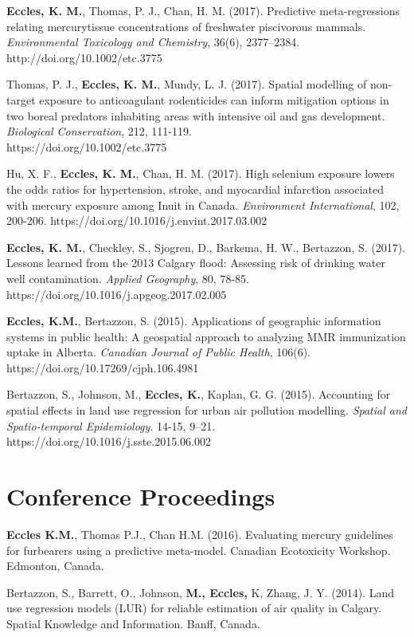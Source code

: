 \documentclass[margin,line]{res}
\begin{document}
\begin{resume}
\textbf{Eccles, K. M.}, Thomas, P. J., Chan, H. M. (2017). Predictive meta-regressions relating mercurytissue concentrations of freshwater piscivorous mammals. \textit{Environmental Toxicology and Chemistry}, 36(6), 2377–2384. http://doi.org/10.1002/etc.3775

Thomas, P. J., \textbf{Eccles, K. M.}, Mundy, L. J. (2017). Spatial modelling of non-target exposure to anticoagulant rodenticides can inform mitigation options in two boreal predators inhabiting areas with intensive oil and gas development. \textit{Biological Conservation}, 212, 111-119. \\https://doi.org/10.1002/etc.3775

Hu, X. F., \textbf{Eccles, K. M.}, Chan, H. M. (2017). High selenium exposure lowers the odds ratios for hypertension, stroke, and myocardial infarction associated with mercury exposure among Inuit in Canada. \textit{Environment International}, 102, 200-206. https://doi.org/10.1016/j.envint.2017.03.002

\textbf{Eccles, K. M.}, Checkley, S., Sjogren, D., Barkema, H. W., Bertazzon, S. (2017). Lessons learned from the 2013 Calgary flood: Assessing risk of drinking water well contamination. \textit{Applied Geography}, 80, 78-85. https://doi.org/10.1016/j.apgeog.2017.02.005

\textbf{Eccles, K.M.}, Bertazzon, S. (2015). Applications of geographic information systems in public health: A geospatial approach to analyzing MMR immunization uptake in Alberta. \textit{Canadian Journal of Public Health}, 106(6). https://doi.org/10.17269/cjph.106.4981

Bertazzon, S., Johnson, M., \textbf{Eccles, K.}, Kaplan, G. G. (2015). Accounting for spatial effects in land use regression for urban air pollution modelling. \textit{Spatial and Spatio-temporal Epidemiology}. 14-15, 9–21. https://doi.org/10.1016/j.sste.2015.06.002

\vspace*{.1in}
\section{\sc Conference Proceedings}
\textbf{Eccles K.M.}, Thomas P.J., Chan H.M. (2016). Evaluating mercury guidelines for furbearers using a predictive meta-model. Canadian Ecotoxicity Workshop. Edmonton, Canada.

Bertazzon, S., Barrett, O., Johnson, \textbf{M., Eccles,} K, Zhang, J. Y. (2014). Land use regression models (LUR) for reliable estimation of air quality in Calgary. Spatial Knowledge and Information. Banff, Canada.\\


\end{resume}
\end{document}
